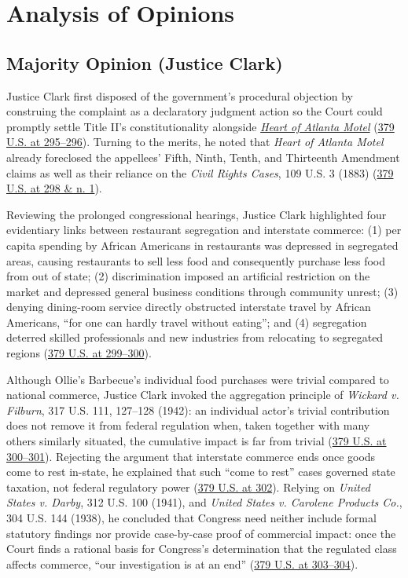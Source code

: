 \documentclass[12pt]{article}
\begin{document}
\section{Analysis of Opinions}

\subsection{Majority Opinion (Justice Clark)}

Justice Clark first disposed of the government's procedural objection by construing the complaint as a declaratory judgment action so the Court could promptly settle Title II's constitutionality alongside \href{https://supreme.justia.com/cases/federal/us/379/241/}{\textit{Heart of Atlanta Motel}} (\href{https://supreme.justia.com/cases/federal/us/379/294/}{379 U.S. at 295--296}). Turning to the merits, he noted that \textit{Heart of Atlanta Motel} already foreclosed the appellees' Fifth, Ninth, Tenth, and Thirteenth Amendment claims as well as their reliance on the \textit{Civil Rights Cases}, 109 U.S. 3 (1883) (\href{https://supreme.justia.com/cases/federal/us/379/294/}{379 U.S. at 298 \& n. 1}).

Reviewing the prolonged congressional hearings, Justice Clark highlighted four evidentiary links between restaurant segregation and interstate commerce: (1) per capita spending by African Americans in restaurants was depressed in segregated areas, causing restaurants to sell less food and consequently purchase less food from out of state; (2) discrimination imposed an artificial restriction on the market and depressed general business conditions through community unrest; (3) denying dining-room service directly obstructed interstate travel by African Americans, ``for one can hardly travel without eating''; and (4) segregation deterred skilled professionals and new industries from relocating to segregated regions (\href{https://supreme.justia.com/cases/federal/us/379/294/}{379 U.S. at 299--300}).

Although Ollie's Barbecue's individual food purchases were trivial compared to national commerce, Justice Clark invoked the aggregation principle of \textit{Wickard v. Filburn}, 317 U.S. 111, 127--128 (1942): an individual actor's trivial contribution does not remove it from federal regulation when, taken together with many others similarly situated, the cumulative impact is far from trivial (\href{https://supreme.justia.com/cases/federal/us/379/294/}{379 U.S. at 300--301}). Rejecting the argument that interstate commerce ends once goods come to rest in-state, he explained that such ``come to rest'' cases governed state taxation, not federal regulatory power (\href{https://supreme.justia.com/cases/federal/us/379/294/}{379 U.S. at 302}). Relying on \textit{United States v. Darby}, 312 U.S. 100 (1941), and \textit{United States v. Carolene Products Co.}, 304 U.S. 144 (1938), he concluded that Congress need neither include formal statutory findings nor provide case-by-case proof of commercial impact: once the Court finds a rational basis for Congress's determination that the regulated class affects commerce, ``our investigation is at an end'' (\href{https://supreme.justia.com/cases/federal/us/379/294/}{379 U.S. at 303--304}).
\end{document}
